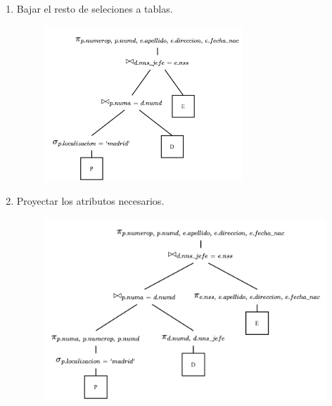 \documentclass{templateNote}
\begin{document}
\begin{enumerate}
\begin{itemize}
\begin{enumerate}
            \newpage
            \item Bajar el resto de seleciones a tablas.
            \begin{figure}[H]
                \centering
                \includegraphics[width=0.7\textwidth]{img/E4-Paso-5.png}
            \end{figure}

            \item Proyectar los atributos necesarios.
            \begin{figure}[H]
                \centering
                \includegraphics[width=\textwidth]{img/E4-Paso-6.png}
            \end{figure}
        \end{enumerate}
    \end{itemize}
\end{enumerate}
\end{document}
